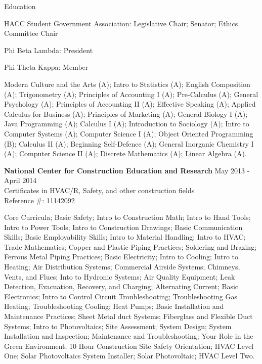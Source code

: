 \documentclass{resume} %
\begin{document}
\begin{rSection}{Education}
\begin{rSubSection}{}
{    \item {HACC Student Government Association:} Legislative Chair; Senator; Ethics Committee Chair
    \item {Phi Beta Lambda:} President
    \item {Phi Theta Kappa:} Member}
    
  \end{rSubSection}
Modern Culture and the Arts (A); Intro to Statistics (A); English Composition (A); Trigonometry (A); Principles of Accounting I (A); Pre-Calculus (A); General Psychology (A); Principles of Accounting II (A); Effective Speaking (A);  Applied Calculus for Business (A); Principles of Marketing (A); General Biology I (A); Java Programming (A); Calculus I (A); Introduction to Sociology (A); Intro to Computer Systems (A); Computer Science I (A); Object Oriented Programming (B); Calculus II (A); Beginning Self-Defence (A); General Inorganic Chemistry I (A); Computer Science II (A); Discrete Mathematics (A); Linear Algebra (A).


{\bf National Center for Construction Education and Research} {May 2013 - April 2014} 
\\ Certificates in HVAC/R, Safety, and other construction fields {}
\\ Reference \#: 11142092
\smallskip \\
\item 
Core Curricula; Basic Safety; Intro to Construction Math; Intro to Hand Tools; Intro to Power Tools; Intro to Construction Drawings; Basic Communication Skills; Basic Employability Skills; Intro to Material Handling; Intro to HVAC; Trade Mathematics; Copper and Plastic Piping Practices; Soldering and Brazing; Ferrous Metal Piping Practices; Basic Electricity; Intro to Cooling; Intro to Heating; Air Distribution Systems; Commercial Airside Systems; Chimneys, Vents, and Flues; Into to Hydronic Systems; Air Quality Equipment; Leak Detection, Evacuation, Recovery, and Charging; Alternating Current; Basic Electronics; Intro to Control Circuit Troubleshooting; Troubleshooting Gas Heating; Troubleshooting Cooling; Heat Pumps; Basic Installation and Maintenance Practices; Sheet Metal duct Systems; Fiberglass and Flexible Duct Systems; Intro to Photovoltaics; Site Assessment; System Design; System Installation and Inspection; Maintenance and Troubleshooting; Your Role in the Green Environment; 10 Hour Construction Site Safety Orientation; HVAC Level One; Solar Photovoltaics System Installer; Solar Photovoltaic; HVAC Level Two.



\end{rSection}
\end{document}
